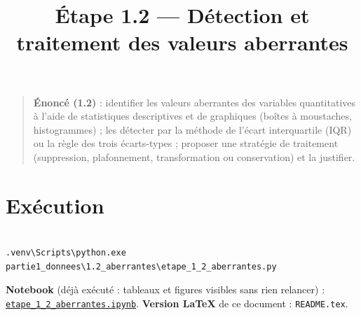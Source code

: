 \documentclass[

  french,

  10pt,

  a4paper,

]{article}
\title{Étape 1.2 --- Détection et traitement des valeurs aberrantes}
\author{}
\date{}
\begin{document}
\maketitle



{

\hypersetup{linkcolor=black}

\setcounter{tocdepth}{3}

\tableofcontents

}

\begin{quote}

\textbf{Énoncé (1.2)} : identifier les valeurs aberrantes des variables quantitatives à l'aide de statistiques descriptives et de graphiques (boîtes à moustaches, histogrammes) ; les détecter par la méthode de l'écart interquartile (IQR) ou la règle des trois écarts-types ; proposer une stratégie de traitement (suppression, plafonnement, transformation ou conservation) et la justifier.

\end{quote}



\section{Exécution}



\begin{verbatim}

.venv\Scripts\python.exe partie1_donnees\1.2_aberrantes\etape_1_2_aberrantes.py

\end{verbatim}



\textbf{Notebook} (déjà exécuté : tableaux et figures visibles sans rien relancer) : \href{etape_1_2_aberrantes.ipynb}{\texttt{etape\_1\_2\_aberrantes.ipynb}}. \textbf{Version LaTeX} de ce document : \texttt{README.tex}.
\end{document}
